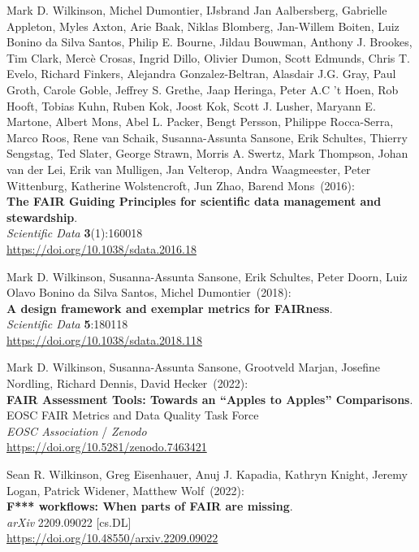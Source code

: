 \begin{thebibliography}{9}
Mark D. Wilkinson, Michel Dumontier, IJsbrand Jan
Aalbersberg, Gabrielle Appleton, Myles Axton, Arie Baak, Niklas
Blomberg, Jan-Willem Boiten, Luiz Bonino da Silva Santos, Philip E.
Bourne, Jildau Bouwman, Anthony J. Brookes, Tim Clark, Mercè Crosas,
Ingrid Dillo, Olivier Dumon, Scott Edmunds, Chris T. Evelo, Richard
Finkers, Alejandra Gonzalez-Beltran, Alasdair J.G. Gray, Paul Groth,
Carole Goble, Jeffrey S. Grethe, Jaap Heringa, Peter A.C 't Hoen, Rob
Hooft, Tobias Kuhn, Ruben Kok, Joost Kok, Scott J. Lusher, Maryann E.
Martone, Albert Mons, Abel L. Packer, Bengt Persson, Philippe
Rocca-Serra, Marco Roos, Rene van Schaik, Susanna-Assunta Sansone, Erik
Schultes, Thierry Sengstag, Ted Slater, George Strawn, Morris A. Swertz,
Mark Thompson, Johan van der Lei, Erik van Mulligen, Jan Velterop, Andra
Waagmeester, Peter Wittenburg, Katherine Wolstencroft, Jun Zhao, Barend
Mons~(2016): \\
\textbf{The FAIR Guiding Principles for scientific data management and
stewardship}.\\
\emph{Scientific Data} \textbf{3}(1):160018\\
\url{https://doi.org/10.1038/sdata.2016.18}

Mark D. Wilkinson, Susanna-Assunta Sansone, Erik Schultes, Peter Doorn, Luiz Olavo Bonino da Silva Santos, Michel Dumontier~(2018): \\
\textbf{A design framework and exemplar metrics for FAIRness}.\\
\emph{Scientific Data} \textbf{5}:180118 \\
\url{https://doi.org/10.1038/sdata.2018.118}

Mark D. Wilkinson, Susanna-Assunta Sansone, Grootveld Marjan, Josefine
Nordling, Richard Dennis, David Hecker~(2022): \\
\textbf{FAIR Assessment Tools: Towards an “Apples to Apples” Comparisons}.\\ 
EOSC FAIR Metrics and Data Quality Task Force\\
\emph{EOSC Association} / \emph{Zenodo}\\
\url{https://doi.org/10.5281/zenodo.7463421}

Sean R. Wilkinson, Greg Eisenhauer, Anuj J. Kapadia, Kathryn Knight,
Jeremy Logan, Patrick Widener, Matthew Wolf~(2022): \\
\textbf{F*** workflows: When parts of {FAIR} are missing}. \\
\emph{arXiv} 2209.09022 [cs.DL] \\
\url{https://doi.org/10.48550/arxiv.2209.09022}


\end{thebibliography}
